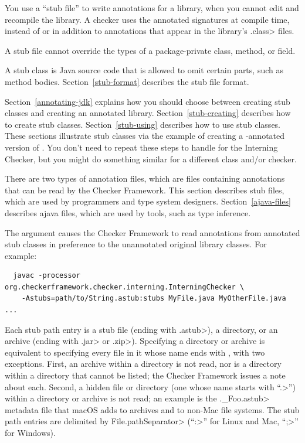 You use a ``stub file'' to write annotations
for a library, when you cannot edit and recompile the library.  A
checker uses the annotated signatures at compile time, instead of or in
addition to annotations that appear in the library's \<.class> files.

A stub file cannot override the types of a package-private class, method, or field.

A stub class is Java source code that is allowed to omit certain parts,
such as method bodies.  Section~\ref{stub-format} describes
the stub file format.

Section~\ref{annotating-jdk} explains how you should choose between
creating stub classes and creating an annotated library.
Section~\ref{stub-creating} describes how to create stub classes.
Section~\ref{stub-using} describes how to use stub classes.
These sections illustrate stub classes via the example of creating a -annotated
version of .  You don't need to repeat these steps
to handle  for the Interning Checker,
but you might do something similar for a different class and/or checker.

There are two types of annotation files, which are files containing annotations that
can be read by the Checker Framework.
This section describes stub files, which are used by programmers and
type system designers.
Section~\ref{ajava-files} describes ajava files, which are used by
tools, such as type inference.



The  argument causes the Checker Framework to read
annotations from annotated stub classes in preference to the unannotated
original library classes.  For example:

\begin{myxsmall}
\begin{Verbatim}
  javac -processor org.checkerframework.checker.interning.InterningChecker \
    -Astubs=path/to/String.astub:stubs MyFile.java MyOtherFile.java ...
\end{Verbatim}
\end{myxsmall}

Each stub path entry is a stub file (ending with
\<.astub>), a directory, or an archive (ending with \<.jar> or \<.zip>).
Specifying a directory or archive is equivalent to
specifying every file in it whose name ends with
, with two exceptions.  First, an archive within a directory is
not read, nor is a directory within a directory that cannot be listed; the
Checker Framework issues a note about each.  Second, a
hidden file or directory (one whose name starts with ``\<.>'') within a
directory or archive is not read; an example is the \<.\_Foo.astub>
metadata file that macOS adds to archives and to non-Mac file systems.
The stub path entries are delimited by
\<File.pathSeparator> (``\<:>'' for Linux and Mac, ``\<;>'' for Windows).

